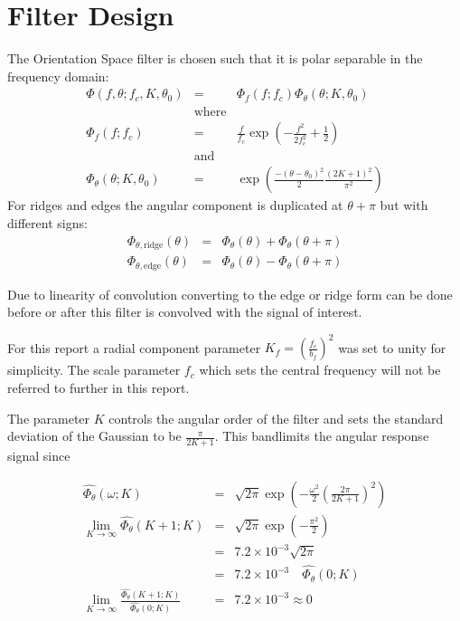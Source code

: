 \documentclass{article}
\begin{document}
\section{Filter Design}
The Orientation Space filter is chosen such that it is polar separable in the frequency domain:
\begin{eqnarray}
    \Phi(f,\theta; f_c, K, \theta_0) & = & \Phi_f(f; f_c) \Phi_\theta(\theta; K, \theta_0) \\
    & \mbox{where} & \nonumber \\
    \Phi_f(f; f_c) & = & \frac{f}{f_c} \exp(-\frac{f^2}{2f_c^2}+\frac{1}{2})  \\
    & \mbox{and} & \nonumber \\
    \Phi_\theta(\theta; K, \theta_0) & = & \exp \left(\frac{-(\theta-\theta_0)^2}{2} \frac{(2K+1)^2}{\pi^2} \right)
\end{eqnarray}
For ridges and edges the angular component is duplicated at $ \theta + \pi $ but with different signs:
\begin{eqnarray}
    \Phi_{\theta,\mbox{ridge}}(\theta) & = & \Phi_{\theta}(\theta) + \Phi_{\theta}(\theta+\pi) \\
    \Phi_{\theta,\mbox{edge}}(\theta) & = & \Phi_{\theta}(\theta) - \Phi_{\theta}(\theta+\pi)
\end{eqnarray}

Due to linearity of convolution converting to the edge or ridge form can be done before or after this filter is convolved with the signal of interest.

For this report a radial component parameter $ K_f = (\frac{f_c}{b_f})^2 $ was set to unity for simplicity. The scale parameter $ f_c $ which sets the central frequency will not be referred to further in this report.

The parameter $ K $ controls the angular order of the filter and sets the standard deviation of the Gaussian to be $ \frac{\pi}{2K+1} $. This bandlimits the angular response signal since

\begin{eqnarray}
	\widehat{\Phi_{\theta}}(\omega ; K) & = & \sqrt{2\pi}\exp\left(-\frac{\omega^2}{2} \left(\frac{2\pi}{2K+1}\right)^2\right)\\
	\lim_{K\to\infty} \widehat{\Phi_{\theta}}(K+1 ; K) & = & \sqrt{2\pi} \exp\left(-\frac{\pi^2}{2}\right) \\
	& = & 7.2 \times 10^{-3} \sqrt{2\pi} \\
    & = & 7.2 \times 10^{-3} \quad \widehat{\Phi_{\theta}}(0 ; K) \\
    \lim_{K\to\infty} \frac{\widehat{\Phi_{\theta}}(K+1 ; K)}{\widehat{\Phi_{\theta}}(0 ; K)} & = & 7.2 \times 10^{-3} \approx  0
\end{eqnarray}
\end{document}
